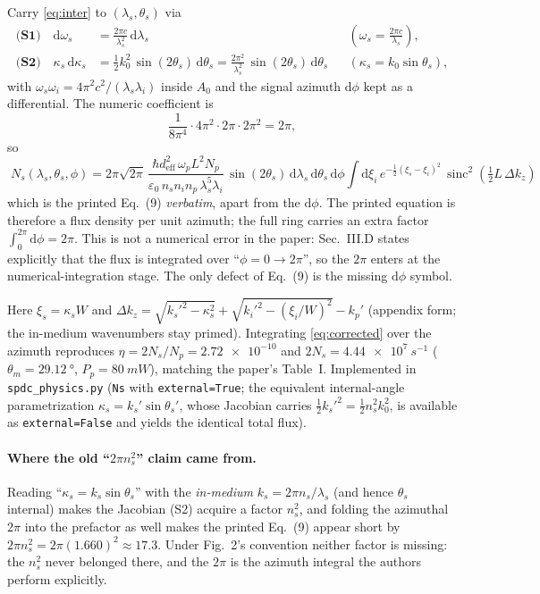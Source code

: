 \documentclass[11pt]{article}
\newcommand{\sinc}{\operatorname{sinc}}
\newcommand{\dd}{\mathrm{d}}
\begin{document}
Carry \eqref{eq:inter} to $(\lambda_s,\theta_s)$ via
\begin{align}
\textbf{(S1)}\quad
\dd\omega_s &= \frac{2\pi c}{\lambda_s^2}\,\dd\lambda_s
&&\left(\omega_s=\tfrac{2\pi c}{\lambda_s}\right),\\[4pt]
\textbf{(S2)}\quad
\kappa_s\,\dd\kappa_s
&= \tfrac12 k_0^2\,\sin(2\theta_s)\,\dd\theta_s
= \frac{2\pi^2}{\lambda_s^2}\,\sin(2\theta_s)\,\dd\theta_s
&&\left(\kappa_s=k_0\sin\theta_s\right),
\end{align}
with $\omega_s\omega_i = 4\pi^2 c^2/(\lambda_s\lambda_i)$ inside $A_0$ and the
signal azimuth $\dd\phi$ kept as a differential. The numeric coefficient is
\begin{equation}
\frac{1}{8\pi^4}\cdot 4\pi^2 \cdot 2\pi \cdot 2\pi^2 = 2\pi ,
\end{equation}
so
\begin{equation}
\boxed{\;
N_s(\lambda_s,\theta_s,\phi) =
2\pi\sqrt{2\pi}\,
\frac{\hbar d_{\mathrm{eff}}^2\,\omega_p L^2 N_p}
{\varepsilon_0\, n_s n_i n_p\,\lambda_s^5\lambda_i}\,
\sin(2\theta_s)\,\dd\lambda_s\,\dd\theta_s\,\dd\phi
\int \dd\xi_i\, e^{-\frac12(\xi_s-\xi_i)^2}\,
\sinc^2\!\left(\tfrac12 L\,\Delta k_z\right)
\;}
\label{eq:corrected}
\end{equation}
which is the printed Eq.~(9) \emph{verbatim}, apart from the $\dd\phi$. The
printed equation is therefore a flux density per unit azimuth; the full ring
carries an extra factor $\int_0^{2\pi}\dd\phi = 2\pi$. This is not a
numerical error in the paper: Sec.~III.D states explicitly that the flux is
integrated over ``$\phi = 0 \to 2\pi$'', so the $2\pi$ enters at the
numerical-integration stage. The only defect of Eq.~(9) is the missing
$\dd\phi$ symbol.

Here $\xi_s=\kappa_s W$ and
$\Delta k_z = \sqrt{k_s'^2-\kappa_s^2} + \sqrt{k_i'^2-(\xi_i/W)^2} - k_p'$
(appendix form; the in-medium wavenumbers stay primed). Integrating
\eqref{eq:corrected} over the azimuth reproduces
$\eta=2N_s/N_p=\num{2.72e-10}$ and $2N_s=\SI{4.44e7}{s^{-1}}$
($\theta_m=\SI{29.12}{\degree}$, $P_p=\SI{80}{mW}$), matching the paper's
Table~I. Implemented in \texttt{spdc\_physics.py} (\texttt{Ns} with
\texttt{external=True}; the equivalent internal-angle parametrization
$\kappa_s = k_s'\sin\theta_s'$, whose Jacobian carries $\tfrac12 k_s'^2 =
\tfrac12 n_s^2 k_0^2$, is available as \texttt{external=False} and yields the
identical total flux).

\paragraph{Where the old ``$2\pi n_s^2$'' claim came from.}
Reading ``$\kappa_s = k_s\sin\theta_s$'' with the \emph{in-medium}
$k_s = 2\pi n_s/\lambda_s$ (and hence $\theta_s$ internal) makes the Jacobian
(S2) acquire a factor $n_s^2$, and folding the azimuthal $2\pi$ into the
prefactor as well makes the printed Eq.~(9) appear short by
$2\pi n_s^2 = 2\pi(1.660)^2 \approx 17.3$. Under Fig.~2's convention neither
factor is missing: the $n_s^2$ never belonged there, and the $2\pi$ is the
azimuth integral the authors perform explicitly.
\end{document}
